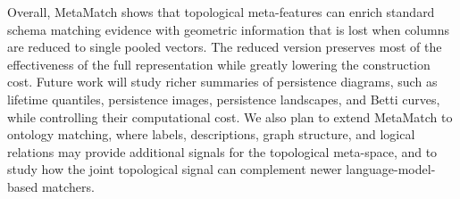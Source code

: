 \documentclass[sigconf, nonacm]{acmart}
\begin{document}
Overall, MetaMatch shows that topological meta-features can enrich standard schema matching evidence with geometric information that is lost when columns are reduced to single pooled vectors. The reduced version preserves most of the effectiveness of the full representation while greatly lowering the construction cost. Future work will study richer summaries of persistence diagrams, such as lifetime quantiles, persistence images, persistence landscapes, and Betti curves, while controlling their computational cost. We also plan to extend MetaMatch to ontology matching, where labels, descriptions, graph structure, and logical relations may provide additional signals for the topological meta-space, and to study how the joint topological signal can complement newer language-model-based matchers.



\end{document}
